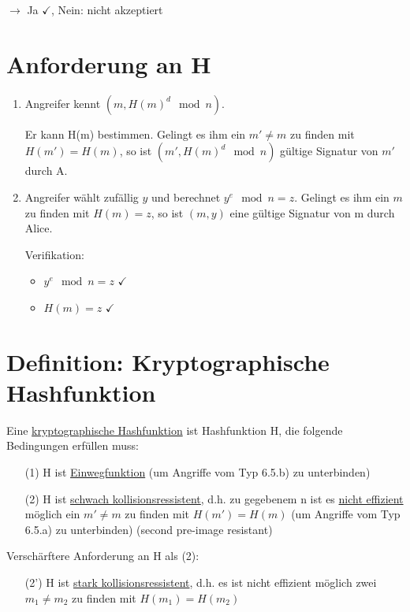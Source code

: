   $\rightarrow$ Ja $\checkmark$, Nein: nicht akzeptiert

  \section{Anforderung an H}

  \begin{enumerate}[label=(\alph*)]
    \item Angreifer kennt $(m, H(m)^d \mod n)$.

    Er kann H(m) bestimmen. Gelingt es ihm ein $m' \neq m$ zu finden mit $H(m') = H(m)$, so ist $(m', H(m)^d \mod n)$ gültige Signatur von $m'$ durch A.

    \item Angreifer wählt zufällig $y$ und berechnet $y^e \mod n = z$. Gelingt es ihm ein $m$ zu finden mit $H(m) = z$, so ist $(m,y)$ eine gültige Signatur von m durch Alice.

    Verifikation:

    \begin{itemize}
      \item $y^e \mod n = z$ $\checkmark$
      \item $H(m) = z$ $\checkmark$
    \end{itemize}
  \end{enumerate}

  \section{Definition: Kryptographische Hashfunktion}

  Eine \underline{kryptographische Hashfunktion} ist Hashfunktion H, die folgende Bedingungen erfüllen muss:

  \begin{enumerate}
    \item[(1)] H ist \underline{Einwegfunktion} (um Angriffe vom Typ 6.5.b) zu unterbinden)
    \item[(2)] H ist \underline{schwach kollisionsressistent}, d.h. zu gegebenem n ist es \underline{nicht effizient} möglich ein $m' \neq m$ zu finden mit $H(m') = H(m)$ (um Angriffe vom Typ 6.5.a) zu unterbinden) (second pre-image resistant)     
  \end{enumerate}

  Verschärftere Anforderung an H als (2):

  \begin{enumerate}
    \item[(2')] H ist \underline{stark kollisionsressistent}, d.h. es ist nicht effizient möglich zwei $m_1 \neq m_2$ zu finden mit $H(m_1) = H(m_2)$
  \end{enumerate}

